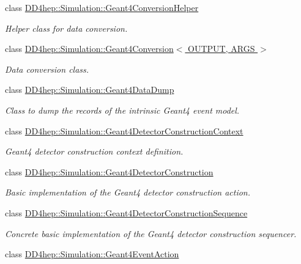 \begin{DoxyCompactItemize}
class \hyperlink{class_d_d4hep_1_1_simulation_1_1_geant4_conversion_helper}{D\+D4hep\+::\+Simulation\+::\+Geant4\+Conversion\+Helper}
\begin{DoxyCompactList}\small\item\em Helper class for data conversion. \end{DoxyCompactList}\item 
class \hyperlink{class_d_d4hep_1_1_simulation_1_1_geant4_conversion}{D\+D4hep\+::\+Simulation\+::\+Geant4\+Conversion$<$ O\+U\+T\+P\+U\+T, A\+R\+G\+S $>$}
\begin{DoxyCompactList}\small\item\em Data conversion class. \end{DoxyCompactList}\item 
class \hyperlink{class_d_d4hep_1_1_simulation_1_1_geant4_data_dump}{D\+D4hep\+::\+Simulation\+::\+Geant4\+Data\+Dump}
\begin{DoxyCompactList}\small\item\em Class to dump the records of the intrinsic Geant4 event model. \end{DoxyCompactList}\item 
class \hyperlink{class_d_d4hep_1_1_simulation_1_1_geant4_detector_construction_context}{D\+D4hep\+::\+Simulation\+::\+Geant4\+Detector\+Construction\+Context}
\begin{DoxyCompactList}\small\item\em Geant4 detector construction context definition. \end{DoxyCompactList}\item 
class \hyperlink{class_d_d4hep_1_1_simulation_1_1_geant4_detector_construction}{D\+D4hep\+::\+Simulation\+::\+Geant4\+Detector\+Construction}
\begin{DoxyCompactList}\small\item\em Basic implementation of the Geant4 detector construction action. \end{DoxyCompactList}\item 
class \hyperlink{class_d_d4hep_1_1_simulation_1_1_geant4_detector_construction_sequence}{D\+D4hep\+::\+Simulation\+::\+Geant4\+Detector\+Construction\+Sequence}
\begin{DoxyCompactList}\small\item\em Concrete basic implementation of the Geant4 detector construction sequencer. \end{DoxyCompactList}\item 
class \hyperlink{class_d_d4hep_1_1_simulation_1_1_geant4_event_action}{D\+D4hep\+::\+Simulation\+::\+Geant4\+Event\+Action}

\end{DoxyCompactItemize}
